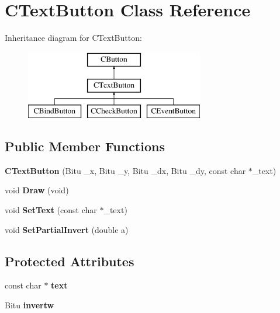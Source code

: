 \hypertarget{classCTextButton}{\section{C\-Text\-Button Class Reference}
\label{classCTextButton}
}
Inheritance diagram for C\-Text\-Button\-:\begin{figure}[H]
\begin{center}
\leavevmode
\includegraphics[height=3.000000cm]{classCTextButton}
\end{center}
\end{figure}
\subsection*{Public Member Functions}
\begin{DoxyCompactItemize}
\item 
\hypertarget{classCTextButton_a150a72742d4babf2ac06dc010c154e9c}{{\bfseries C\-Text\-Button} (Bitu \-\_\-x, Bitu \-\_\-y, Bitu \-\_\-dx, Bitu \-\_\-dy, const char $\ast$\-\_\-text)}\label{classCTextButton_a150a72742d4babf2ac06dc010c154e9c}

\item 
\hypertarget{classCTextButton_a2d0a1e7ff590e3fc5862b163ae694e15}{void {\bfseries Draw} (void)}\label{classCTextButton_a2d0a1e7ff590e3fc5862b163ae694e15}

\item 
\hypertarget{classCTextButton_ada76ffbe1e1c4f4f00f91a4b9cc5fa08}{void {\bfseries Set\-Text} (const char $\ast$\-\_\-text)}\label{classCTextButton_ada76ffbe1e1c4f4f00f91a4b9cc5fa08}

\item 
\hypertarget{classCTextButton_a31e1521c3b64ad3d4439c841238ea73b}{void {\bfseries Set\-Partial\-Invert} (double a)}\label{classCTextButton_a31e1521c3b64ad3d4439c841238ea73b}

\end{DoxyCompactItemize}
\subsection*{Protected Attributes}
\begin{DoxyCompactItemize}
\item 
\hypertarget{classCTextButton_ad572feca242235783d9b3710c87c6eaf}{const char $\ast$ {\bfseries text}}\label{classCTextButton_ad572feca242235783d9b3710c87c6eaf}

\item 
\hypertarget{classCTextButton_a43d7518a60dbfe98814fd22fc20c916f}{Bitu {\bfseries invertw}}\label{classCTextButton_a43d7518a60dbfe98814fd22fc20c916f}

\end{DoxyCompactItemize}



